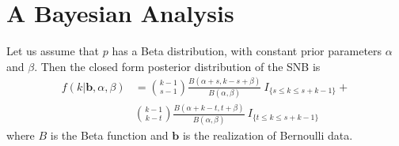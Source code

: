 \documentclass[12pt]{article}         %
\begin{document}


\section{A Bayesian Analysis}



Let us assume that $p$ has a Beta distribution, with constant prior 
parameters $\alpha$ and $\beta$. Then the closed form 
posterior distribution of the SNB is
\begin{align}
f \left(k | \mathbf{b}, \alpha, \beta \right) &= 
  {k-1 \choose s-1} \frac{B\left(\alpha+s, k-s+\beta \right)}{B(\alpha, \beta)} 
  \ I_{\{s \leq k \leq s+k-1\}} + \nonumber \\
  & {k-1 \choose k-t} 
  \frac{B\left(\alpha + k - t, t+\beta\right)}{B(\alpha, \beta)} 
  \ I_{\{t \leq k \leq s+k-1\}}
\end{align}
where $B$ is the Beta function and $\mathbf{b}$ is the realization 
of Bernoulli data.
\end{document}
